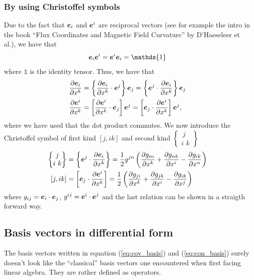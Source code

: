 \documentclass[a4paper, 12pt]{article}
\begin{document}
\subsubsection{By using Christoffel symbols}
Due to the fact that $\boldsymbol{e}_i$ and $\boldsymbol{e}^i$ are reciprocal vectors (see for
example the intro in the book ``Flux Coordinates and Magnetic Field Curvature''
by D'Haeseleer et al.), we have that
%
\begin{align*}
 \ve{e}_i\ve{e}^i = \ve{e}^i\ve{e}_i = \mathds{1}
\end{align*}
%
where $\mathds{1}$ is the identity tensor. Thus, we have that
%
\begin{align*}
 \frac{\partial {\boldsymbol{e}_i}}{\partial{x^k}} &= \left\{\frac{\partial {\boldsymbol{e}_i}}{\partial{x^k}} \cdot \boldsymbol{e}^j\right\} \boldsymbol{e}_j
 =  \left\{\boldsymbol{e}^j \cdot \frac{\partial {\boldsymbol{e}_i}}{\partial{x^k}} \right\} \boldsymbol{e}_j\\
 \frac{\partial {\boldsymbol{e}^i}}{\partial{x^k}} &= \left[\frac{\partial {\boldsymbol{e}^i}}{\partial{x^k}} \cdot \boldsymbol{e}_j\right] \boldsymbol{e}^j
 =  \left[\boldsymbol{e}_j \cdot \frac{\partial {\boldsymbol{e}^i}}{\partial{x^k}} \right] \boldsymbol{e}^j,
\end{align*}
%
where we have used that the dot product commutes. We now introduce the
Christoffel symbol of first kind $[j, ik]$ and second kind
$
 \begin{Bmatrix}
   \,j\,\\
  i\,\,k
 \end{Bmatrix}
$
%
\begin{align*}
 \begin{Bmatrix}
   \,j\,\\
  i\,\,k
 \end{Bmatrix}
 &=  \left\{\boldsymbol{e}^j \cdot \frac{\partial {\boldsymbol{e}_i}}{\partial{x^k}} \right\}
 = \frac{1}{2}g^{jn}\left(\frac{\partial {g_{ni}}}{\partial{x^k}} + \frac{\partial {g_{nk}}}{\partial{x^i}} -
   \frac{\partial {g_{ik}}}{\partial{x^n}}\right)\\
 [j,ik]
 &=\left[\boldsymbol{e}_j \cdot \frac{\partial {\boldsymbol{e}^i}}{\partial{x^k}} \right]
 = \frac{1}{2}\left(\frac{\partial {g_{ji}}}{\partial{x^k}} + \frac{\partial {g_{jk}}}{\partial{x^i}} -
   \frac{\partial {g_{ik}}}{\partial{x^j}}\right)
\end{align*}
%
where $g_{ij}=\boldsymbol{e}_i\cdot\boldsymbol{e}_j$, $g^{ij}=\boldsymbol{e}^i\cdot\boldsymbol{e}^j$ and the
last relation can be shown in a straigth forward way.






\subsection{Basis vectors in differential form}\label{sec:bvdf}
The basis vectors written in equation (\ref{eq:cov_basis}) and
(\ref{eq:con_basis}) surely doesn't look like the ``classical'' basis vectors
one encountered when first facing linear algebra. They are rather defined as
operators.
\end{document}
